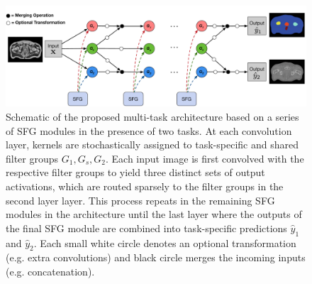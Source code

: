\begin{figure}[ht]

    \center
	\includegraphics[width=\linewidth]{chapter_6/figures/schematic_03.pdf}
	\caption{\footnotesize Schematic of the proposed multi-task architecture based on a series of SFG modules in the presence of two tasks. At each convolution layer, kernels are stochastically assigned to task-specific and shared filter groups $G_{1}, G_{s}, G_{2}$. Each input image is first convolved with the respective filter groups to yield three distinct sets of output activations, which are routed sparsely to the filter groups in the second layer layer. This process repeats in the remaining SFG modules in the architecture until the last layer where the outputs of the final SFG module are combined into task-specific predictions $\hat{y}_{1}$ and $\hat{y}_{2}$. Each small white circle denotes an optional transformation (e.g. extra convolutions) and black circle merges the incoming inputs (e.g. concatenation).}
    \label{fig:schematic}
\end{figure}


